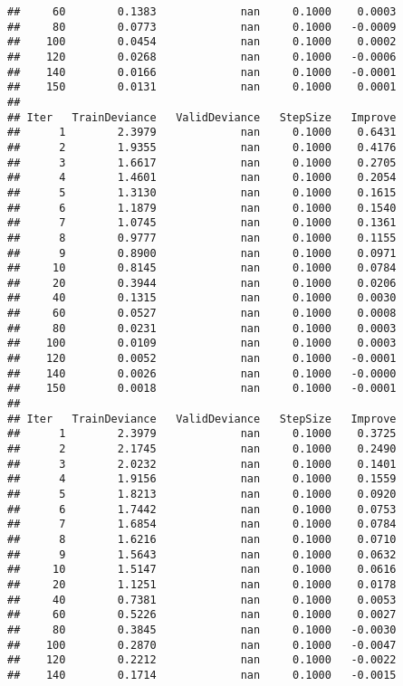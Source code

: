 \documentclass[]{article}
\begin{document}
\begin{verbatim}
##     60        0.1383             nan     0.1000    0.0003
##     80        0.0773             nan     0.1000   -0.0009
##    100        0.0454             nan     0.1000    0.0002
##    120        0.0268             nan     0.1000   -0.0006
##    140        0.0166             nan     0.1000   -0.0001
##    150        0.0131             nan     0.1000    0.0001
## 
## Iter   TrainDeviance   ValidDeviance   StepSize   Improve
##      1        2.3979             nan     0.1000    0.6431
##      2        1.9355             nan     0.1000    0.4176
##      3        1.6617             nan     0.1000    0.2705
##      4        1.4601             nan     0.1000    0.2054
##      5        1.3130             nan     0.1000    0.1615
##      6        1.1879             nan     0.1000    0.1540
##      7        1.0745             nan     0.1000    0.1361
##      8        0.9777             nan     0.1000    0.1155
##      9        0.8900             nan     0.1000    0.0971
##     10        0.8145             nan     0.1000    0.0784
##     20        0.3944             nan     0.1000    0.0206
##     40        0.1315             nan     0.1000    0.0030
##     60        0.0527             nan     0.1000    0.0008
##     80        0.0231             nan     0.1000    0.0003
##    100        0.0109             nan     0.1000    0.0003
##    120        0.0052             nan     0.1000   -0.0001
##    140        0.0026             nan     0.1000   -0.0000
##    150        0.0018             nan     0.1000   -0.0001
## 
## Iter   TrainDeviance   ValidDeviance   StepSize   Improve
##      1        2.3979             nan     0.1000    0.3725
##      2        2.1745             nan     0.1000    0.2490
##      3        2.0232             nan     0.1000    0.1401
##      4        1.9156             nan     0.1000    0.1559
##      5        1.8213             nan     0.1000    0.0920
##      6        1.7442             nan     0.1000    0.0753
##      7        1.6854             nan     0.1000    0.0784
##      8        1.6216             nan     0.1000    0.0710
##      9        1.5643             nan     0.1000    0.0632
##     10        1.5147             nan     0.1000    0.0616
##     20        1.1251             nan     0.1000    0.0178
##     40        0.7381             nan     0.1000    0.0053
##     60        0.5226             nan     0.1000    0.0027
##     80        0.3845             nan     0.1000   -0.0030
##    100        0.2870             nan     0.1000   -0.0047
##    120        0.2212             nan     0.1000   -0.0022
##    140        0.1714             nan     0.1000   -0.0015

\end{verbatim}
\end{document}
